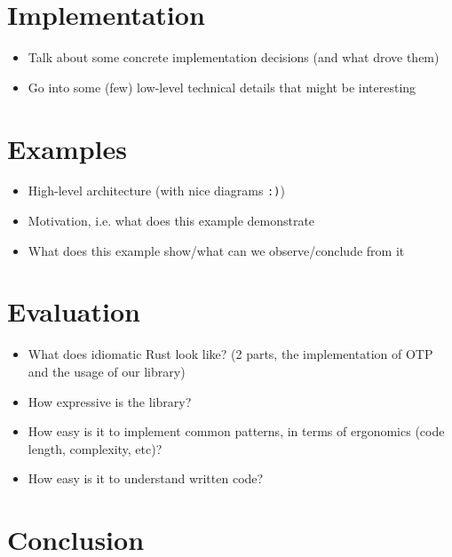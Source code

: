 \documentclass[a4paper]{article}
\begin{document}
\section{Implementation}
\begin{itemize}
\item Talk about some concrete implementation decisions (and what drove them)
\item Go into some (few) low-level technical details that might be interesting
\end{itemize}

\section{Examples}
\begin{itemize}
\item High-level architecture (with nice diagrams \texttt{:)})
\item Motivation, i.e. what does this example demonstrate
\item What does this example show/what can we observe/conclude from it
\end{itemize}

\section{Evaluation}
\begin{itemize}
\item What does idiomatic Rust look like? (2 parts, the implementation of OTP
  and the usage of our library)
\item How expressive is the library?
\item How easy is it to implement common patterns, in terms of ergonomics (code
  length, complexity, etc)?
\item How easy is it to understand written code?
\end{itemize}

\section{Conclusion}
\end{document}
